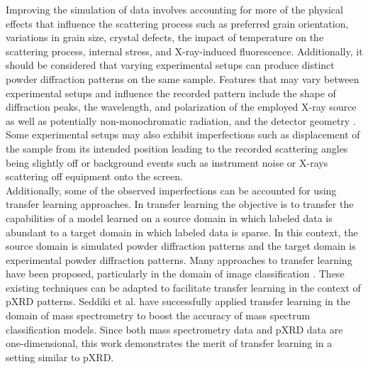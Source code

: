 Improving the simulation of data involves accounting for more of the physical effects that influence the scattering process such as preferred grain orientation, variations in grain size, crystal defects, the impact of temperature on the scattering process, internal stress, and X-ray-induced fluorescence\cite{cao2024simxrd, Waseda2011, Pecharsky2023}.  Additionally, it should be considered that varying experimental setups can produce distinct powder diffraction patterns on the same sample. Features that may vary between experimental setups and influence the recorded pattern include the shape of diffraction peaks, the wavelength, and polarization of the employed X-ray source as well as potentially non-monochromatic radiation, and the detector geometry
\cite{cao2024simxrd, Waseda2011, Pecharsky2023}. Some experimental setups may also exhibit imperfections such as displacement of the sample from its intended position leading to the recorded scattering angles being slightly off \cite{cao2024simxrd,hulbert2023} or background events such as instrument noise or X-rays scattering off equipment onto the screen.\\

Additionally, some of the observed imperfections can be accounted for using transfer learning approaches. In transfer learning the objective is to transfer the capabilities of a model learned on a source domain in which labeled data is abundant to a target domain in which labeled data is sparse\cite{Zhuang2021}. In this context, the source domain is simulated powder diffraction patterns and the target domain is experimental powder diffraction patterns. Many approaches to transfer learning have been proposed, particularly in the domain of image classification \cite{Gatys2016, Ganin2015}. These existing techniques can be adapted to facilitate transfer learning in the context of pXRD patterns. Seddiki et al. have successfully applied transfer learning in the domain of mass spectrometry to boost the accuracy of mass spectrum classification models\cite{Seddiki2020}. Since both mass spectrometry data and pXRD data are one-dimensional, this work demonstrates the merit of transfer learning in a setting similar to pXRD. \\

